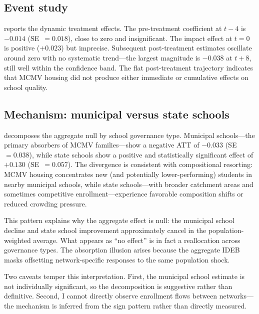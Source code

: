 \documentclass[12pt]{article}
\begin{document}
\subsection{Event study}



 reports the dynamic treatment effects. The pre-treatment coefficient at $t-4$ is $-0.014$ (SE~$= 0.018$), close to zero and insignificant. The impact effect at $t=0$ is positive ($+0.023$) but imprecise. Subsequent post-treatment estimates oscillate around zero with no systematic trend---the largest magnitude is $-0.038$ at $t+8$, still well within the confidence band. The flat post-treatment trajectory indicates that MCMV housing did not produce either immediate or cumulative effects on school quality.

\subsection{Mechanism: municipal versus state schools}



 decomposes the aggregate null by school governance type. Municipal schools---the primary absorbers of MCMV families---show a negative ATT of $-0.033$ (SE~$= 0.038$), while state schools show a positive and statistically significant effect of $+0.130$ (SE~$= 0.057$). The divergence is consistent with compositional resorting: MCMV housing concentrates new (and potentially lower-performing) students in nearby municipal schools, while state schools---with broader catchment areas and sometimes competitive enrollment---experience favorable composition shifts or reduced crowding pressure.

This pattern explains why the aggregate effect is null: the municipal school decline and state school improvement approximately cancel in the population-weighted average. What appears as ``no effect'' is in fact a reallocation across governance types. The absorption illusion arises because the aggregate IDEB masks offsetting network-specific responses to the same population shock.

Two caveats temper this interpretation. First, the municipal school estimate is not individually significant, so the decomposition is suggestive rather than definitive. Second, I cannot directly observe enrollment flows between networks---the mechanism is inferred from the sign pattern rather than directly measured.
\end{document}
